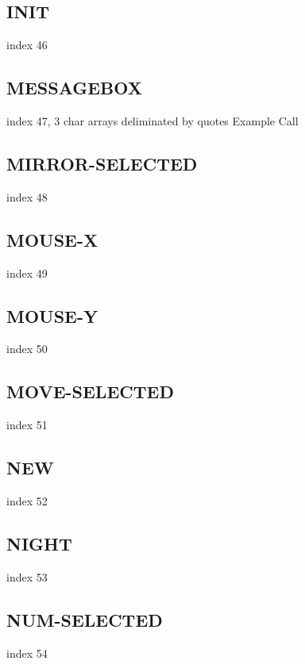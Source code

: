 \documentclass[a4paper]{report}
\begin{document}
\subsection{INIT}

index 46

\subsection{MESSAGEBOX}

index 47, 3 char arrays deliminated by quotes Example Call

\subsection{MIRROR-SELECTED}

index 48

\subsection{MOUSE-X}

index 49

\subsection{MOUSE-Y}

index 50

\subsection{MOVE-SELECTED}

index 51

\subsection{NEW}

index 52

\subsection{NIGHT}

index 53

\subsection{NUM-SELECTED}

index 54
\end{document}
